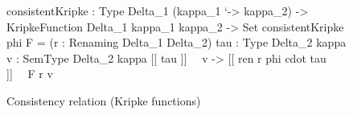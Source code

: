 \begin{figure}
\begin{agdaf}
consistentKripke : Type Delta_1 (kappa_1 `-> kappa_2) -> 
              KripkeFunction Delta_1  kappa_1  kappa_2 -> Set 
consistentKripke phi F = 
  (r : Renaming Delta_1  Delta_2) 
  {tau : Type Delta_2 kappa} {v : SemType Delta_2 kappa}
  [[ tau ]]~~ v -> [[ ren r phi cdot tau ]]~~ F r v
\end{agdaf}
\caption{Consistency relation (Kripke functions)}
\label{fig:consistentKripke}
\end{figure}